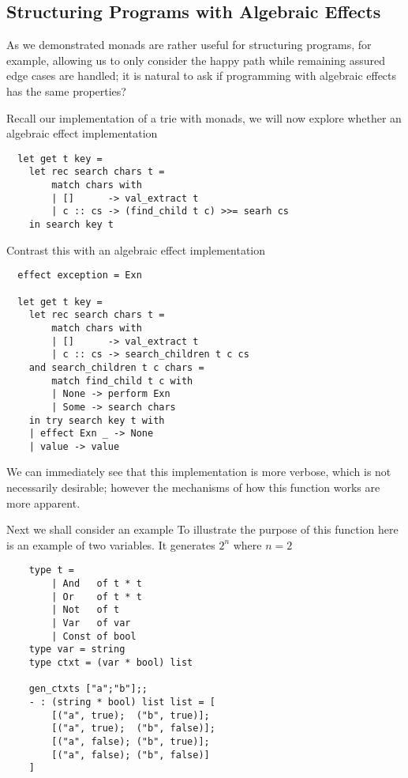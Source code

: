 \subsection{Structuring Programs with Algebraic Effects}
As we demonstrated monads are rather useful for structuring programs,
for example,
allowing us to only consider the happy path while remaining assured
edge cases are handled;
it is natural to ask if programming with algebraic effects
has the same properties?

Recall our implementation of a trie with monads,
we will now explore whether an algebraic effect implementation
\begin{verbatim}
  let get t key =
    let rec search chars t =
        match chars with
        | []      -> val_extract t
        | c :: cs -> (find_child t c) >>= searh cs
    in search key t
\end{verbatim}

Contrast this with an algebraic effect implementation

\begin{verbatim}
  effect exception = Exn

  let get t key =
    let rec search chars t =
        match chars with
        | []      -> val_extract t
        | c :: cs -> search_children t c cs
    and search_children t c chars =
        match find_child t c with
        | None -> perform Exn
        | Some -> search chars
    in try search key t with
    | effect Exn _ -> None
    | value -> value
\end{verbatim}

We can immediately see that this implementation is more verbose,
which is not necessarily desirable;
however the mechanisms of how this function works
are more apparent.

Next we shall consider an example
To illustrate the purpose of this function here
is an example of two variables.
It generates $2^n$ where $n = 2$

\begin{verbatim}
    type t =
        | And   of t * t
        | Or    of t * t
        | Not   of t
        | Var   of var
        | Const of bool
    type var = string
    type ctxt = (var * bool) list

    gen_ctxts ["a";"b"];;
    - : (string * bool) list list = [
        [("a", true);  ("b", true)];
        [("a", true);  ("b", false)];
        [("a", false); ("b", true)];
        [("a", false); ("b", false)]
    ]
\end{verbatim}

